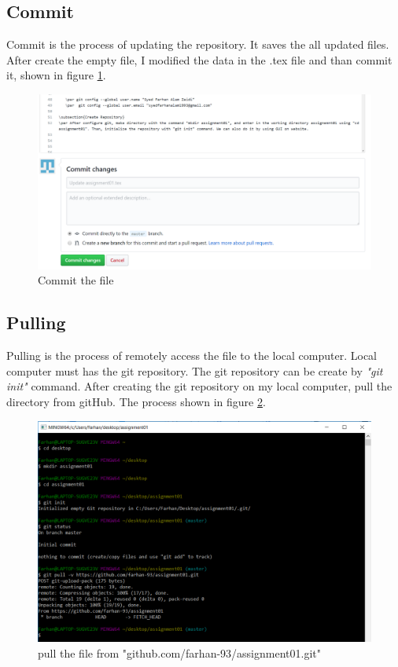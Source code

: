 \documentclass[paper=a4, fontsize=12pt]{scrartcl}
\numberwithin{equation}{section} %
\numberwithin{figure}{section} %
\numberwithin{table}{section} %
\begin{document}
\subsection{Commit}
Commit is the process of updating the repository. It saves the all updated files. After create the empty file, I modified the data in the .tex file and than commit it, shown in figure \ref{ccom}.

\begin{figure}
\includegraphics[width=\linewidth]{Commit.PNG}
\caption{Commit the file}
\label{ccom}
\end{figure}


\subsection{Pulling}
Pulling is the process of remotely access the file to the local computer. Local computer must has the git repository. 
The git repository can be create by \textit{"git init"} command. After creating the git repository on my local computer, pull the directory from gitHub. The process shown in figure \ref{cpull}.



\begin{figure}
\includegraphics[width=\linewidth]{pull.png}
\caption{pull the file from "github.com/farhan-93/assignment01.git"}
\label{cpull}
\end{figure}
\end{document}
